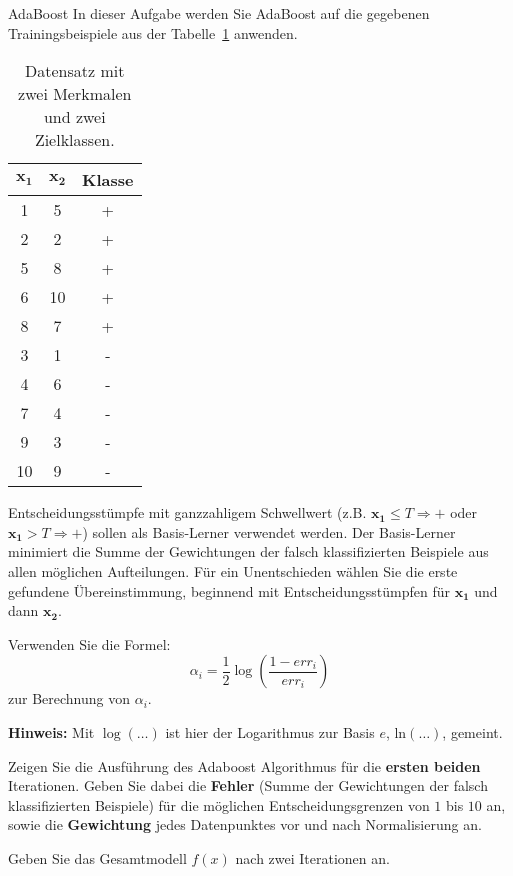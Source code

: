 \begin{task}[credit=15]{AdaBoost}
In dieser Aufgabe werden Sie AdaBoost auf die gegebenen Trainingsbeispiele aus der Tabelle~\ref{t:boost_data} anwenden. 

\begin{table}[h]
\caption{Datensatz mit zwei Merkmalen und zwei Zielklassen.}
\label{t:boost_data}
\centering
\begin{tabular}{c|c|c}
$\mathbf{x_1}$ & $\mathbf{x_2}$  & \textbf{Klasse} \\
\midrule
1 & 5  & +      \\
2 & 2  & +      \\
5 & 8  & +      \\
6 & 10 & +      \\
8 & 7  & +      \\
3  & 1 & -      \\
4  & 6  & -     \\
7  & 4  & -     \\
9  & 3  & -     \\
10 & 9  & -     \\
\bottomrule
\end{tabular}
\end{table}

Entscheidungsstümpfe mit ganzzahligem Schwellwert (z.B. $\mathbf{x_1}\leq T \Rightarrow +$ oder $\mathbf{x_1} > T \Rightarrow +$) sollen als Basis-Lerner verwendet werden. Der Basis-Lerner minimiert die Summe der Gewichtungen der falsch klassifizierten Beispiele aus allen möglichen Aufteilungen. Für ein Unentschieden wählen Sie die erste gefundene Übereinstimmung, beginnend mit Entscheidungsstümpfen für $\mathbf{x_1}$ und dann $\mathbf{x_2}$.

Verwenden Sie die Formel:
\begin{equation}
    \alpha_{i} = \frac{1}{2}\log\left (\frac{1-err_{i}}{err_{i}}\right )
\end{equation}
zur Berechnung von $\alpha_{i}$.

\textbf{Hinweis:} Mit $\log(\dots)$ ist hier der Logarithmus zur Basis $e$, $\text{ln}(\dots)$, gemeint.

\begin{subtask}[title=Algorithmus,points=12]
 Zeigen Sie die Ausführung des Adaboost Algorithmus für die \textbf{ersten beiden} Iterationen.
 Geben Sie dabei die \textbf{Fehler} (Summe der Gewichtungen der falsch klassifizierten Beispiele) für die möglichen Entscheidungsgrenzen von $1$ bis $10$ an, sowie die \textbf{Gewichtung} jedes Datenpunktes vor und nach Normalisierung an.

\begin{solution}
\end{solution}
\end{subtask}

\begin{subtask}[title=Gesamtmodell,points=3]
 Geben Sie das Gesamtmodell $f(x)$ nach zwei Iterationen an.
\begin{solution}
\end{solution}
\end{subtask}

\end{task}

